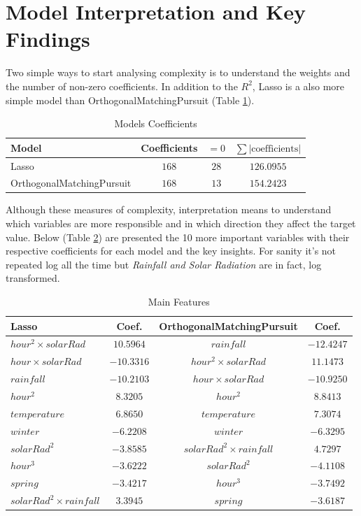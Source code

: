 \documentclass[11pt, a4]{article}
\begin{document}
\section*{Model Interpretation and Key Findings}

Two simple ways to start analysing complexity is to understand the weights and the number of non-zero coefficients. In addition to the $R^2$, Lasso is a also more simple model than OrthogonalMatchingPursuit (Table \ref{table:4}).

 \begin{table}[h!]
\centering
\begin{tabular}{l c c c}
\toprule
\textbf{Model} & \textbf{Coefficients} & \textbf{$=0$} & \textbf{$\sum{|\text{coefficients}|}$} \\
\midrule
Lasso & $168$ & $28$& $126.0955$\\
OrthogonalMatchingPursuit & $168$ & $13$ & $154.2423$\\
\bottomrule
\end{tabular}
\caption{Models Coefficients}
\label{table:4}
\end{table}

Although these measures of complexity, interpretation means to understand which variables are more responsible and in which direction they affect the target value. Below (Table \ref{table:5}) are presented the 10 more important variables with their respective coefficients for each model and the key insights. For sanity it's not repeated log all the time but \textit{Rainfall and Solar Radiation} are in fact, log transformed.


 \begin{table}[h]
\centering
\begin{tabular}{l c |c c}
\toprule
\textbf{Lasso} & \textbf{Coef.} & \textbf{OrthogonalMatchingPursuit} & \textbf{Coef.} \\
\midrule
$hour^2\times solarRad$ & $10.5964$ & $rainfall$& $-12.4247$\\
$hour\times solarRad$  & $-10.3316$ & $hour^2\times solarRad$ & $11.1473$\\
$rainfall$ & $-10.2103$ & $hour\times solarRad$ & $-10.9250$ \\
$hour^2$ & $8.3205$ & $hour^2$ & $8.8413$ \\
$temperature$ & $6.8650$ & $temperature$ & $7.3074$ \\
$winter$ & $-6.2208$ & $winter$ & $-6.3295$\\
$solarRad^2$ & $-3.8585$ & $solarRad^2\times rainfall$ & $4.7297$ \\
$hour^3$ & $-3.6222$ & $solarRad^2$ & $-4.1108$ \\
$spring$ & $-3.4217$ & $hour^3$ & $-3.7492$ \\
$solarRad^2\times rainfall$ & $3.3945$ & $spring$ & $-3.6187$ \\
\bottomrule
\end{tabular}
\caption{Main Features}
\label{table:5}
\end{table}
\end{document}
